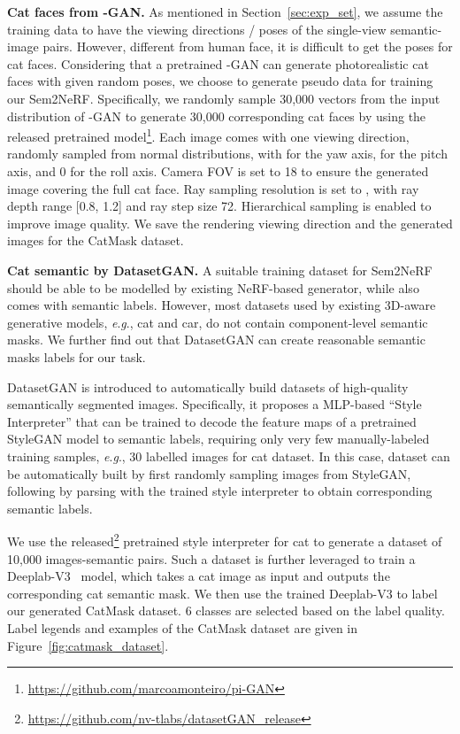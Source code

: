 \documentclass[runningheads]{llncs}
\newcommand{\eg}{\textit{e}.\textit{g}.}
\begin{document}
\textbf{Cat faces from -GAN.} As mentioned in Section~\ref{sec:exp_set}, we assume the training data to have the viewing directions / poses of the single-view semantic-image pairs. However, different from human face, it is difficult to get the poses for cat faces. Considering that a pretrained -GAN can generate photorealistic cat faces with given random poses, we choose to generate pseudo data for training our Sem2NeRF. Specifically, we randomly sample 30,000 vectors  from the input distribution of -GAN to generate 30,000 corresponding cat faces by using the released pretrained model\footnote{\url{https://github.com/marcoamonteiro/pi-GAN}}. Each image comes with one  viewing direction, randomly sampled from normal distributions, with  for the yaw axis,  for the pitch axis, and 0 for the roll axis. Camera FOV is set to 18 to ensure the generated image covering the full cat face. Ray sampling resolution is set to , with ray depth range [0.8, 1.2] and ray step size 72. Hierarchical sampling is enabled to improve image quality. We save the rendering viewing direction and the generated images for the CatMask dataset.

\textbf{Cat semantic by DatasetGAN.} A suitable training dataset for Sem2NeRF should be able to be modelled by existing NeRF-based generator, while also comes with semantic labels. 
However, most datasets used by existing 3D-aware generative models, \eg, cat and car, do not contain component-level semantic masks. We further find out that DatasetGAN can create reasonable semantic masks labels for our task.

DatasetGAN is introduced to automatically build datasets of high-quality semantically segmented images.
Specifically, it proposes a MLP-based ``Style Interpreter'' that can be trained to decode the feature maps of a pretrained StyleGAN model to semantic labels, requiring only very few manually-labeled training samples, \eg, 30 labelled images for cat dataset. In this case, dataset can be automatically built by first randomly sampling images from StyleGAN, following by parsing with the trained style interpreter to obtain corresponding semantic labels. 

We use the released\footnote{\url{https://github.com/nv-tlabs/datasetGAN\_release}} pretrained style interpreter for cat to generate a dataset of 10,000 images-semantic pairs. Such a dataset is further leveraged to train a Deeplab-V3~\cite{chen2017deeplab} model, which takes a cat image as input and outputs the corresponding cat semantic mask. We then use the trained Deeplab-V3 to label our generated CatMask dataset. 6 classes are selected based on the label quality. Label legends and examples of the CatMask dataset are given in Figure~\ref{fig:catmask_dataset}.
\end{document}
